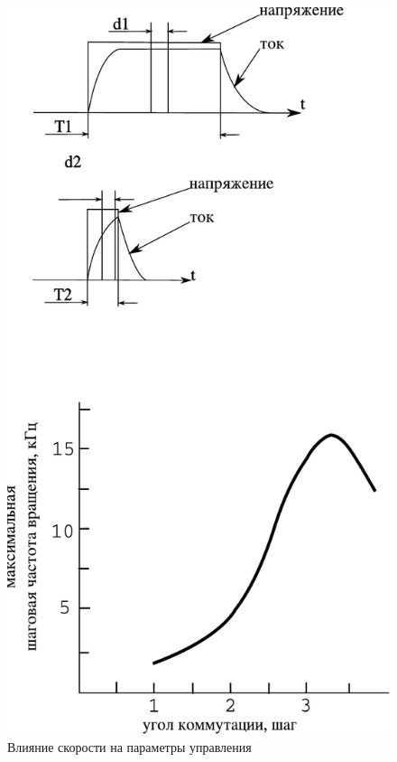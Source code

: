 \begin{figure}
    \centering
    \includegraphics[height=0.75\textheight, keepaspectratio]
        {./src/pictures/max_step_motor_by_com_angle}
    \caption{Влияние скорости на параметры управления}
    \label{graph_speed_and_angle_comutation}
\end{figure}

